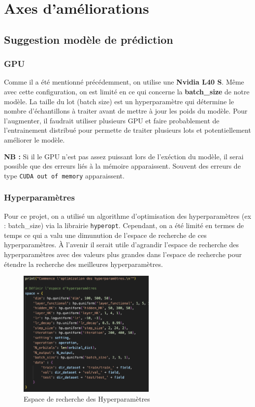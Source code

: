 \section{Axes d'améliorations}

\subsection{Suggestion modèle de prédiction}

\subsubsection{GPU}

Comme il a été mentionné précédemment, on utilise une \textbf{Nvidia L40 S}.
Même avec cette configuration, on est limité en ce qui concerne la \textbf{batch\_size} de notre modèle. 
La taille du lot (batch size) est un hyperparamètre qui détermine le nombre d'échantillons à traiter avant de mettre à jour les poids du modèle.
Pour l'augmenter, il faudrait utiliser plusieurs GPU et faire probablement de l'entrainement distribué pour permette de traiter plusieurs lots et potentiellement améliorer le modèle.

\textbf{NB :} Si il le GPU n'est pas assez puissant lors de l'exéction du modèle, il serai possible que des erreurs liés à la mémoire apparaissent. Souvent des erreurs de type \texttt{CUDA out of memory} apparaissent.

\subsubsection{Hyperparamètres}
Pour ce projet, on a utilisé un algorithme d'optimisation des hyperparamètres (ex : batch\_size) via la librairie \texttt{hyperopt}.
Cependant, on a été limité en termes de temps ce qui a valu une dimunution de l'espace de recherche de ces hyperparamètres.  
À l'avenir il serait utile d'agrandir l'espace de recherche des hyperparamètres avec des valeurs plus grandes dans l'espace de recherche pour étendre la recherche des meilleures hyperparamètres.

\begin{figure}[H]
    \centering
    \includegraphics[width=0.6\textwidth]{Overview/hyper.png}
    \caption{Espace de recherche des Hyperparamètres}
\end{figure}

